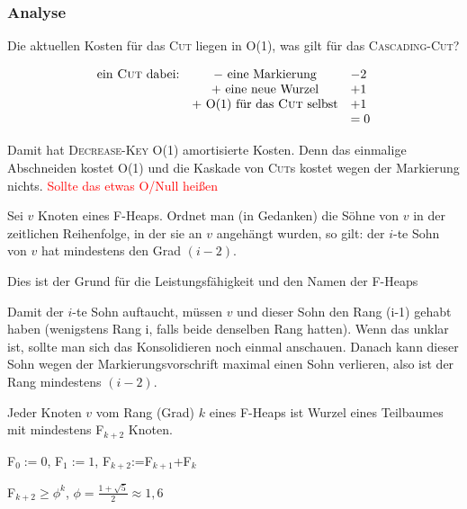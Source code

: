 \subsubsection{Analyse}
Die aktuellen Kosten für das \textsc{Cut} liegen in O(1), was gilt für das \textsc{Cascading-Cut}?

\[
\begin{array}{ccl}
\mbox{ein \textsc{Cut} dabei:} & - \mbox{ eine Markierung} & -2\\
 &  + \mbox{ eine neue Wurzel} & +1\\
 &  + \mbox{ O(1) für das \textsc{Cut} selbst} & +1\\
 &  & =0
\end{array}\]

Damit hat \textsc{Decrease-Key} O(1) amortisierte Kosten. Denn das einmalige Abschnei\-den kostet O(1) und die Kaskade von
\textsc{Cut}s kostet wegen der Markierung nichts. \textcolor{red}{Sollte das etwas O/Null heißen}

\begin{satz}
Sei $v$ Knoten eines F-Heaps. Ordnet man (in Gedanken) die Söhne von $v$ in der zeitlichen Reihenfolge, in der sie an
$v$ angehängt wurden, so gilt: der $i$-te Sohn von $v$ hat mindestens den Grad $(i-2)$. 
\end{satz}
Dies ist der Grund für die Leistungsfähigkeit und den Namen der F-Heaps

\begin{beweis}
Damit der $i$-te Sohn auftaucht, müssen $v$ und dieser Sohn den Rang (i-1) gehabt haben (wenigstens Rang i, falls beide
denselben Rang hatten). Wenn das unklar ist, sollte man sich das Konsolidieren noch einmal anschauen. Danach kann dieser
Sohn wegen der Markierungsvorschrift maximal einen Sohn verlieren, also ist der Rang mindestens $(i-2)$. 
\end{beweis}

\begin{satz}
Jeder Knoten $v$ vom Rang (Grad) $k$ eines F-Heaps ist Wurzel eines Teilbaumes mit mindestens F$_{k+2}$ Knoten.
\end{satz}

\begin{definition}
F$_0:=0$, F$_1:=1$, F$_{k+2}$:=F$_{k+1}$+F$_{k}$
\end{definition}

\begin{satz}
F$_{k+2} \geq {\phi}^k$, $\phi=\frac{1+\sqrt{5}}{2}\approx 1,6$ 
\end{satz}

